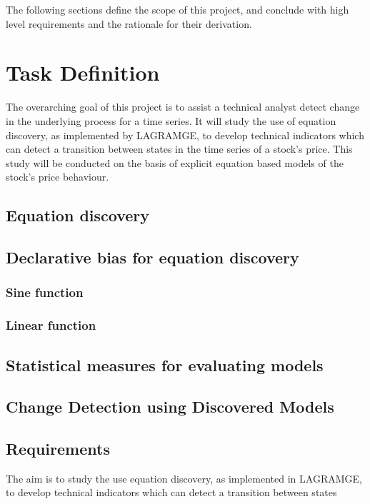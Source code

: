 \documentclass[13pt]{report}
\begin{document}
The following sections define the scope of this project, and conclude with high level requirements and the rationale for their derivation.

\section{Task Definition}
The overarching goal of this project is to assist a technical analyst detect change in the underlying process for a time series. It will study the use of equation discovery, as implemented by LAGRAMGE, to develop technical indicators which can detect a transition between states in the time series of a stock's price. This study will be conducted on the basis of explicit equation based models of the stock's price behaviour. 

\subsection{Equation discovery}

\subsection{Declarative bias for equation discovery}

\subsubsection{Sine function}

\subsubsection{Linear function}

\subsection{Statistical measures for evaluating models}

\subsection{Change Detection using Discovered Models}

\subsection{Requirements}


The aim is to study the use equation discovery, as implemented in LAGRAMGE,  to develop technical indicators which can detect a transition between states 
\end{document}
